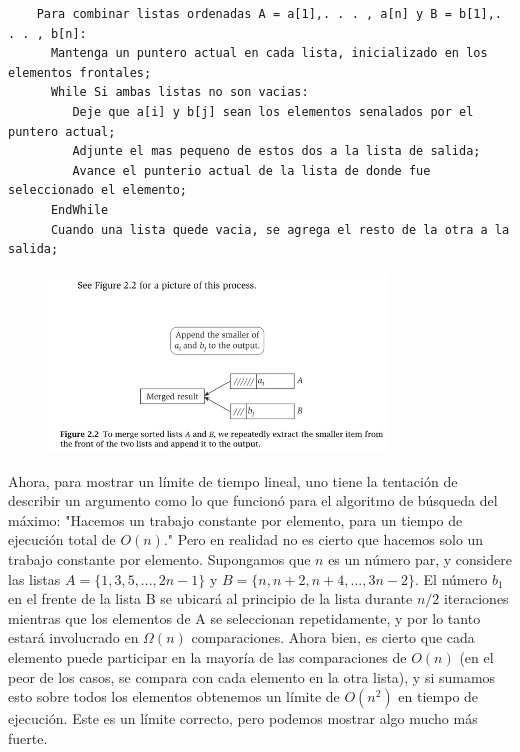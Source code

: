 \documentclass[a4paper, 12pt]{book}
\theoremstyle{dotless}
\begin{document}
\begin{lstlisting}
	Para combinar listas ordenadas A = a[1],. . . , a[n] y B = b[1],. . . , b[n]:
      Mantenga un puntero actual en cada lista, inicializado en los elementos frontales;
      While Si ambas listas no son vacias:
         Deje que a[i] y b[j] sean los elementos senalados por el puntero actual;
         Adjunte el mas pequeno de estos dos a la lista de salida;
         Avance el punterio actual de la lista de donde fue seleccionado el elemento;
      EndWhile
      Cuando una lista quede vacia, se agrega el resto de la otra a la salida;
\end{lstlisting}



\begin{figure}[h] 
  \centering
    \includegraphics[width=0.8\textwidth]{Imagenes-Seccion2/fig2_2_real.PNG}
\end{figure}


Ahora, para mostrar un límite de tiempo lineal, uno tiene la tentación de describir un argumento como lo que funcionó para el algoritmo de búsqueda del máximo: "Hacemos un trabajo constante por elemento, para un tiempo de ejecución total de $O(n)$." Pero en realidad no es cierto que hacemos solo un trabajo constante por elemento. Supongamos que $n$ es un número par, y considere las listas $A =\{ 1, 3, 5,. . . , 2n-1\}$ y $B =\{ n, n + 2, n + 4,. . . , 3n-2 \}$. El número $b_1$ en el frente de la lista B se ubicará al principio de la lista durante $n / 2$ iteraciones mientras que los elementos de A se seleccionan repetidamente, y por lo tanto estará involucrado en $\Omega(n)$ comparaciones. Ahora bien, es cierto que cada elemento puede participar en la mayoría de las comparaciones de $O(n)$ (en el peor de los casos, se compara con cada elemento en la otra lista), y si sumamos esto sobre todos los elementos obtenemos un límite de $O(n^2)$ en tiempo de ejecución. Este es un límite correcto, pero podemos mostrar algo mucho más fuerte.\\
\end{document}
